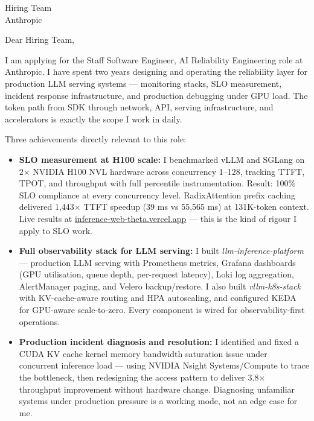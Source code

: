 \documentclass[12pt,a4paper]{letter}
\date{\today}
\begin{document}
\begin{letter}{Hiring Team \\ Anthropic}

\opening{Dear Hiring Team,}

I am applying for the Staff Software Engineer, AI Reliability Engineering role at Anthropic. I have spent two years designing and operating the reliability layer for production LLM serving systems — monitoring stacks, SLO measurement, incident response infrastructure, and production debugging under GPU load. The token path from SDK through network, API, serving infrastructure, and accelerators is exactly the scope I work in daily.

Three achievements directly relevant to this role:

\begin{itemize}
  \item \textbf{SLO measurement at H100 scale:} I benchmarked vLLM and SGLang on 2$\times$ NVIDIA H100 NVL hardware across concurrency 1--128, tracking TTFT, TPOT, and throughput with full percentile instrumentation. Result: 100\% SLO compliance at every concurrency level. RadixAttention prefix caching delivered 1,443$\times$ TTFT speedup (39 ms vs 55,565 ms) at 131K-token context. Live results at \href{https://inference-web-theta.vercel.app/benchmarks/llm}{inference-web-theta.vercel.app} — this is the kind of rigour I apply to SLO work.

  \item \textbf{Full observability stack for LLM serving:} I built \textit{llm-inference-platform} — production LLM serving with Prometheus metrics, Grafana dashboards (GPU utilisation, queue depth, per-request latency), Loki log aggregation, AlertManager paging, and Velero backup/restore. I also built \textit{vllm-k8s-stack} with KV-cache-aware routing and HPA autoscaling, and configured KEDA for GPU-aware scale-to-zero. Every component is wired for observability-first operations.

  \item \textbf{Production incident diagnosis and resolution:} I identified and fixed a CUDA KV cache kernel memory bandwidth saturation issue under concurrent inference load — using NVIDIA Nsight Systems/Compute to trace the bottleneck, then redesigning the access pattern to deliver 3.8$\times$ throughput improvement without hardware change. Diagnosing unfamiliar systems under production pressure is a working mode, not an edge case for me.
\end{itemize}


\end{letter}
\end{document}
